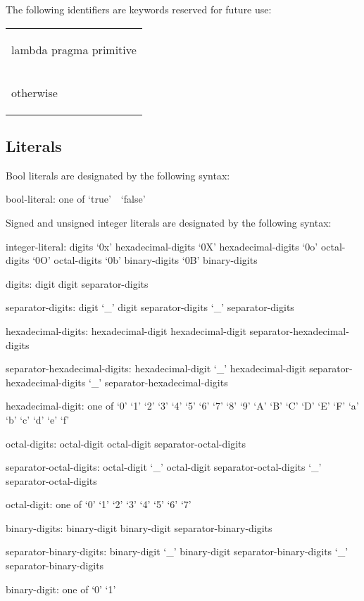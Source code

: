 The following identifiers are keywords reserved for future use:

\begin{tabular}{p{2in}}
\begin{chapel}
lambda
pragma
primitive
\end{chapel}
\\
\begin{invisible}
otherwise
\end{invisible}
\end{tabular}

\subsection{Literals}
\label{Literals}
\label{Primitive_Type_Literals}

Bool literals are designated by the following syntax:
\begin{syntax}
bool-literal: one of
  `true' $ $ $ $ `false'
\end{syntax}

Signed and unsigned integer literals are designated by the following
syntax:
\begin{syntax}
integer-literal:
  digits
  `0x' hexadecimal-digits
  `0X' hexadecimal-digits
  `0o' octal-digits
  `0O' octal-digits
  `0b' binary-digits
  `0B' binary-digits

digits:
  digit
  digit separator-digits

separator-digits:
  digit
  `_'
  digit separator-digits
  `_' separator-digits

hexadecimal-digits:
  hexadecimal-digit
  hexadecimal-digit separator-hexadecimal-digits

separator-hexadecimal-digits:
  hexadecimal-digit
  `_'
  hexadecimal-digit separator-hexadecimal-digits
  `_' separator-hexadecimal-digits

hexadecimal-digit: one of
  `0' `1' `2' `3' `4' `5' `6' `7' `8' `9' `A' `B' `C' `D' `E' `F' `a' `b' `c' `d' `e' `f'

octal-digits:
  octal-digit
  octal-digit separator-octal-digits

separator-octal-digits:
  octal-digit
  `_'
  octal-digit separator-octal-digits
  `_' separator-octal-digits

octal-digit: one of
  `0' `1' `2' `3' `4' `5' `6' `7'

binary-digits:
  binary-digit
  binary-digit separator-binary-digits

separator-binary-digits:
  binary-digit
  `_'
  binary-digit separator-binary-digits
  `_' separator-binary-digits

binary-digit: one of
  `0' `1'
\end{syntax}

